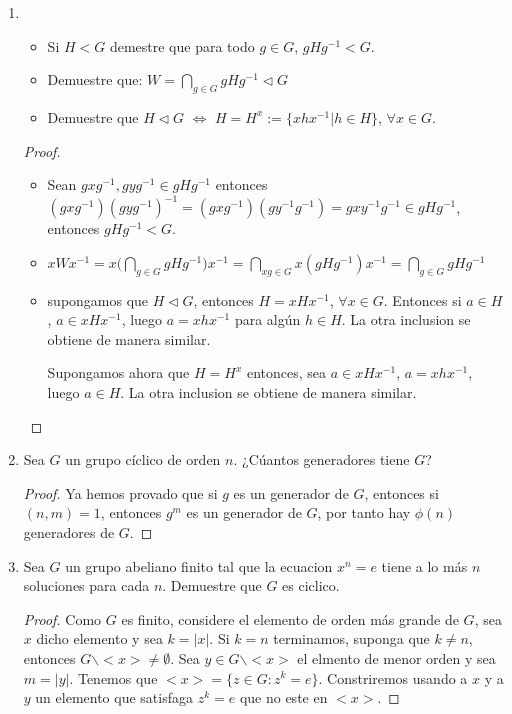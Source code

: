 \documentclass{article}
\theoremstyle{break}
\begin{document}
\begin{enumerate}
		\item 
		\begin{itemize}
			\item Si $H<G$ demestre que para todo $g\in G$, $gHg^{-1}<G$.
			\item Demuestre que: $W=\displaystyle\bigcap_{g\in G}{gHg^{-1}}\triangleleft G$
			\item Demuestre que $H\triangleleft G$ $\Leftrightarrow$ $H=H^x:=\{xhx^{-1}|h\in H\}$, $\forall x\in G$.
			
		\end{itemize}
		
		\begin{proof}
			
			\begin{itemize}
				\item Sean $gxg^{-1}, gyg^{-1}\in gHg^{-1}$ entonces $(gxg^{-1})(gyg^{-1})^{-1}=(gxg^{-1})(gy^{-1}g^{-1})=gxy^{-1}g^{-1}\in gHg^{-1}$, entonces $gHg^{-1}<G$.
				
				\item $xWx^{-1}=x\big(\displaystyle\bigcap_{g\in G}{gHg^{-1}}\big)x^{-1}=\displaystyle\bigcap_{xg\in G}{x(gHg^{-1})x^{-1}}=\displaystyle\bigcap_{g\in G}{gHg^{-1}}$
				
				\item supongamos que $H\triangleleft G$, entonces $H=xHx^{-1}$, $\forall x\in G$. Entonces si $a\in H$, $a\in xHx^{-1}$, luego $a=xhx^{-1}$ para algún $h\in H$. La otra inclusion se obtiene de manera similar.
				
				Supongamos ahora que $H=H^x$ entonces, sea $a\in xHx^{-1}$, $a=xhx^{-1}$, luego $a\in H$. La otra inclusion se obtiene de manera similar.
			\end{itemize}
		\end{proof}
		
		\item Sea $G$ un grupo c\'iclico de orden $n$. ¿C\'uantos generadores tiene $G$?
		
		\begin{proof}
			Ya hemos provado que si $g$ es un generador de $G$, entonces si $(n,m)=1$, entonces $g^m$ es un generador de $G$, por tanto hay $\phi(n)$ generadores de $G$.
		\end{proof}
		
		\item Sea $G$ un grupo abeliano finito tal que la ecuacion $x^n=e$ tiene a lo m\'as $n$ soluciones para cada $n$. Demuestre que $G$ es ciclico.
		
		\begin{proof}
			Como $G$ es finito, considere el elemento de orden m\'as grande de $G$, sea $x$ dicho elemento y sea $k=|x|$. Si $k=n$ terminamos, suponga que $k\not= n$, entonces $G\backslash<x>\not=\emptyset$. Sea $y\in G\backslash<x>$ el elmento de menor orden y sea $m=|y|$. Tenemos que $<x>=\{z\in G: z^k=e\}$. Constriremos usando a $x$ y a $y$ un elemento que satisfaga $z^k=e$ que no este en $<x>$. 
			

\end{proof}
\end{enumerate}
\end{document}
